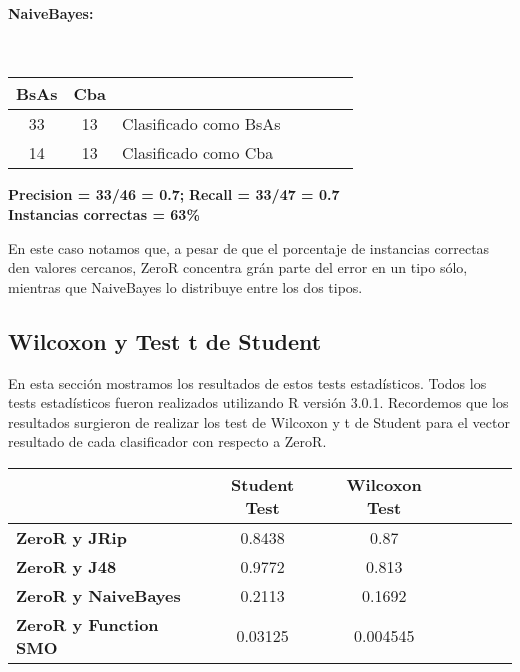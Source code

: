 \paragraph*{NaiveBayes:}\mbox{}\\
\begin{table}[H]
\centering
\begin{tabular}{|c|c|l|c|c|c|c|}
\hline
 BsAs & Cba &  \\ \hline
 33 &  13 &  Clasificado como BsAs \\ \hline
 14 &  13 &  Clasificado como Cba \\ \hline
\end{tabular}
\end{table}
\begin{center}
\textbf{Precision = 33/46 = 0.7;} \textbf{Recall = 33/47 = 0.7}\\
\textbf{Instancias correctas = 63\%}
\end{center}

En este caso notamos que, a pesar de que el porcentaje de instancias correctas den valores cercanos, ZeroR concentra grán parte del error en un tipo sólo, mientras que NaiveBayes lo distribuye entre los dos tipos.

\subsection{Wilcoxon y Test t de Student}

En esta sección mostramos los resultados de estos tests estadísticos. Todos los tests estadísticos fueron realizados utilizando R versión 3.0.1. Recordemos que los resultados surgieron de realizar los test de Wilcoxon y t de Student para el vector resultado de cada clasificador con respecto a ZeroR.


\begin{table}[H]
\centering
\begin{tabular}{|l|c|c|c|c|c|c|}
\hline
\textbf{}  & \textbf{Student Test} & \textbf{Wilcoxon Test} \\ \hline
\textbf{ZeroR y JRip}  & 0.8438 & 0.87 \\ \hline
\textbf{ZeroR y J48}  & 0.9772 & 0.813 \\ \hline
\textbf{ZeroR y NaiveBayes}  & 0.2113 & 0.1692 \\ \hline
\textbf{ZeroR y Function SMO}  & 0.03125 & 0.004545 \\ \hline
\end{tabular}
\end{table}

